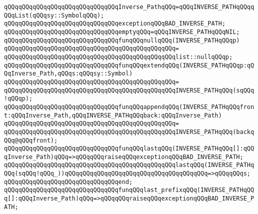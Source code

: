 \newline
\verb|qQQqqQQqqQQqqQQqqQQqqQQqqQQqqQQqInverse_PathqQQq=qQQqINVERSE_PATHqQQqqQQqList(qQQqsy::SymbolqQQq);|\newline
\newline
\verb|qQQqqQQqqQQqqQQqqQQqqQQqqQQqqQQqexceptionqQQqBAD_INVERSE_PATH;|\newline
\newline
\verb|qQQqqQQqqQQqqQQqqQQqqQQqqQQqqQQqemptyqQQq=qQQqINVERSE_PATHqQQqNIL;|\newline
\newline
\verb|qQQqqQQqqQQqqQQqqQQqqQQqqQQqqQQqfunqQQqnullqQQq(INVERSE_PATHqQQqp)|\newline
\verb|qQQqqQQqqQQqqQQqqQQqqQQqqQQqqQQqqQQqqQQqqQQqqQQq=|\newline
\verb|qQQqqQQqqQQqqQQqqQQqqQQqqQQqqQQqqQQqqQQqqQQqqQQqlist::nullqQQqp;|\newline
\newline
\verb|qQQqqQQqqQQqqQQqqQQqqQQqqQQqqQQqfunqQQqextendqQQq(INVERSE_PATHqQQqp:qQQqInverse_Path,qQQqs:qQQqsy::Symbol)|\newline
\verb|qQQqqQQqqQQqqQQqqQQqqQQqqQQqqQQqqQQqqQQqqQQqqQQq=|\newline
\verb|qQQqqQQqqQQqqQQqqQQqqQQqqQQqqQQqqQQqqQQqqQQqqQQqINVERSE_PATHqQQq(sqQQq!qQQqp);|\newline
\newline
\verb|qQQqqQQqqQQqqQQqqQQqqQQqqQQqqQQqfunqQQqappendqQQq(INVERSE_PATHqQQqfront:qQQqInverse_Path,qQQqINVERSE_PATHqQQqback:qQQqInverse_Path)|\newline
\verb|qQQqqQQqqQQqqQQqqQQqqQQqqQQqqQQqqQQqqQQqqQQqqQQq=|\newline
\verb|qQQqqQQqqQQqqQQqqQQqqQQqqQQqqQQqqQQqqQQqqQQqqQQqINVERSE_PATHqQQq(backqQQq@qQQqfront);|\newline
\newline
\verb|qQQqqQQqqQQqqQQqqQQqqQQqqQQqqQQqfunqQQqlastqQQq(INVERSE_PATHqQQq[]:qQQqInverse_Path)qQQq=>qQQqqQQqraiseqQQqexceptionqQQqBAD_INVERSE_PATH;|\newline
\verb|qQQqqQQqqQQqqQQqqQQqqQQqqQQqqQQqqQQqqQQqqQQqqQQqlastqQQq(INVERSE_PATHqQQq(sqQQq!qQQq_))qQQqqQQqqQQqqQQqqQQqqQQqqQQqqQQqqQQqqQQq=>qQQqqQQqs;|\newline
\verb|qQQqqQQqqQQqqQQqqQQqqQQqqQQqqQQqend;|\newline
\newline
\verb|qQQqqQQqqQQqqQQqqQQqqQQqqQQqqQQqfunqQQqlast_prefixqQQq(INVERSE_PATHqQQq[]:qQQqInverse_Path)qQQq=>qQQqqQQqraiseqQQqexceptionqQQqBAD_INVERSE_PATH;|\newline
